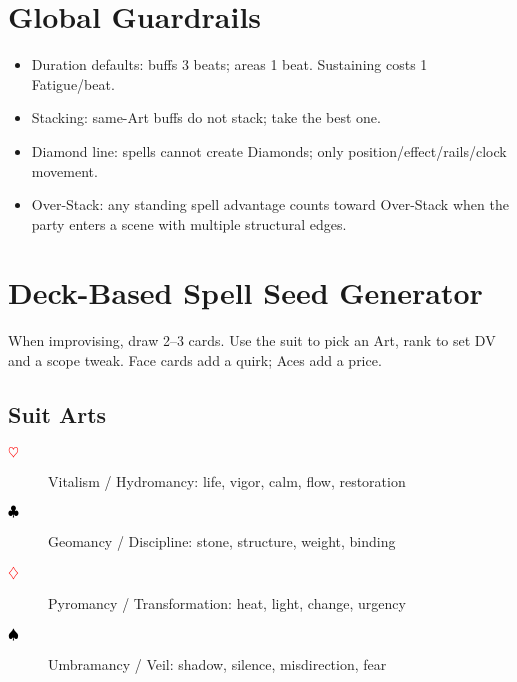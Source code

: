 \section{Global Guardrails}

\begin{itemize}
\item Duration defaults: buffs 3 beats; areas 1 beat. Sustaining costs 1 Fatigue/beat.
\item Stacking: same-Art buffs do not stack; take the best one.
\item Diamond line: spells cannot create Diamonds; only position/effect/rails/clock movement.
\item Over-Stack: any standing spell advantage counts toward Over-Stack when the party enters a scene with multiple structural edges.
\end{itemize}

\section{Deck-Based Spell Seed Generator}

When improvising, draw 2--3 cards. Use the suit to pick an Art, rank to set DV and a scope tweak. Face cards add a quirk; Aces add a price.

\subsection{Suit Arts}
\begin{description}
\item[\textcolor{red}{$\heartsuit$}] Vitalism / Hydromancy: life, vigor, calm, flow, restoration
\item[\textcolor{black}{$\clubsuit$}] Geomancy / Discipline: stone, structure, weight, binding
\item[\textcolor{red}{$\diamondsuit$}] Pyromancy / Transformation: heat, light, change, urgency
\item[\textcolor{black}{$\spadesuit$}] Umbramancy / Veil: shadow, silence, misdirection, fear
\end{description}

